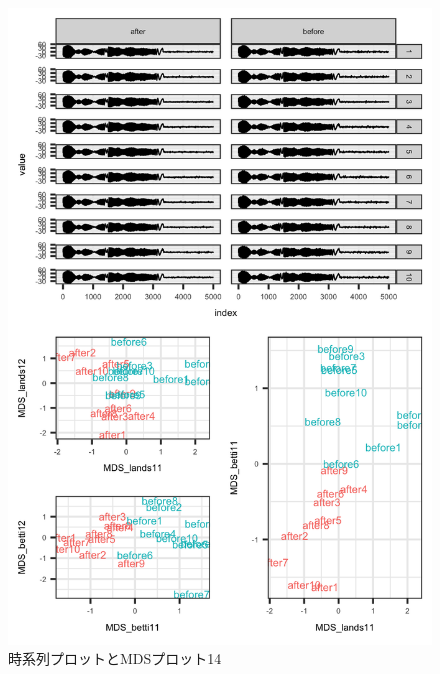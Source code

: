 \documentclass{jarticle}
\begin{document}
\begin{figure}[H]
	\begin{center}
		\includegraphics[width=15cm]{fig/MDS_plot14.png}
		\caption{時系列プロットとMDSプロット14}
		\label{fig:MDS_plot14}
	\end{center}
\end{figure}
\end{document}
